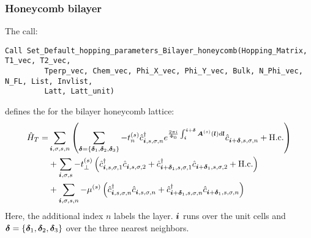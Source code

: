 \subsubsection*{Honeycomb  bilayer}
The call:
\begin{lstlisting}[style=fortran]
Call Set_Default_hopping_parameters_Bilayer_honeycomb(Hopping_Matrix, T1_vec, T2_vec,
         Tperp_vec, Chem_vec, Phi_X_vec, Phi_Y_vec, Bulk, N_Phi_vec, N_FL, List, Invlist,
         Latt, Latt_unit)
\end{lstlisting}  
defines  the   for the  bilayer  honeycomb  lattice:                 
\begin{align}
\hat{H}_T  =  &   \sum_{\boldsymbol{i}, \sigma, s,n } \left(  \sum_{ \boldsymbol{\delta} = \left\{ \boldsymbol{\delta}_1, \boldsymbol{\delta}_2, \boldsymbol{\delta}_3 \right\} }  - t_n^{(s)} \hat{c}^{\dagger}_{\boldsymbol{i},s,\sigma,n}   e^{\frac{2 \pi i}{\Phi_0} \int_{\boldsymbol{i}}^{\boldsymbol{i}+ \boldsymbol{\delta}}  \boldsymbol{A}^{(s)}(\boldsymbol{l})  d \boldsymbol{l}}   \hat{c}^{}_{\boldsymbol{i} + \boldsymbol{\delta},s,\sigma,n} +  \mathrm{H.c.} \right)       \nonumber \\
      & +   \sum_{\boldsymbol{i}, \sigma, s } -  t_{\perp}^{(s)}  \left( \hat{c}^{\dagger}_{\boldsymbol{i},s,\sigma,1} \hat{c}^{}_{\boldsymbol{i},s,\sigma,2}   +
                   \hat{c}^{\dagger}_{\boldsymbol{i} + \boldsymbol{\delta}_1,s,\sigma,1} \hat{c}^{}_{\boldsymbol{i} + \boldsymbol{\delta}_1,s,\sigma,2}  + \mathrm{H.c.}  \right)   \nonumber \\
      & +   \sum_{\boldsymbol{i}, \sigma, s, n }  -  \mu^{(s)}  \left(\hat{c}^{\dagger}_{\boldsymbol{i},s,\sigma,n} \hat{c}^{}_{\boldsymbol{i},s,\sigma,n}  +  \hat{c}^{\dagger}_{\boldsymbol{i} + \boldsymbol{\delta}_1,s,\sigma,n} \hat{c}^{}_{\boldsymbol{i} + \boldsymbol{\delta}_1 ,s,\sigma,n}  \right)  
\end{align}
Here, the additional  index  $n$  labels the layer.   $\boldsymbol{i} $   runs over the unit cells  and   $\boldsymbol{\delta} = \left\{ \boldsymbol{\delta}_1, \boldsymbol{\delta}_2, \boldsymbol{\delta}_3 \right\} $  over the three nearest neighbors. 


